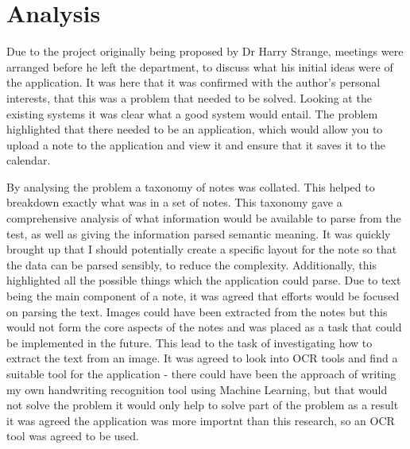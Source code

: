 \section{Analysis}


Due to the project originally being proposed by Dr Harry Strange, meetings were arranged before he left the department, to discuss what his initial ideas were of the application. It was here that it was confirmed with the author's personal interests, that this was a problem that needed to be solved. Looking at the existing systems it was clear what a good system would entail. The problem highlighted that there needed to be an application, which would allow you to upload a note to the application and view it and ensure that it saves it to the calendar. 

By analysing the problem a taxonomy of notes was collated. This helped to breakdown exactly what was in a set of notes. This taxonomy gave a comprehensive analysis of what information would be available to parse from the test, as well as giving the information parsed semantic meaning. It was quickly brought up that I should potentially create a specific layout for the note so that the data can be parsed sensibly, to reduce the complexity. Additionally, this highlighted all the possible things which the application could parse. Due to text being the main component of a note, it was agreed that efforts would be focused on parsing the text. Images could have been extracted from the notes but this would not form the core aspects of the notes and was placed as a task that could be implemented in the future.  This lead to the task of investigating how to extract the text from an image.  It was agreed to look into OCR tools and find a suitable tool for the application - there could have been the approach of writing my own handwriting recognition tool using Machine Learning, but that would not solve the problem it would only help to solve part of the problem as a result it was agreed the application was more importnt than this research, so an OCR tool was agreed to be used.

